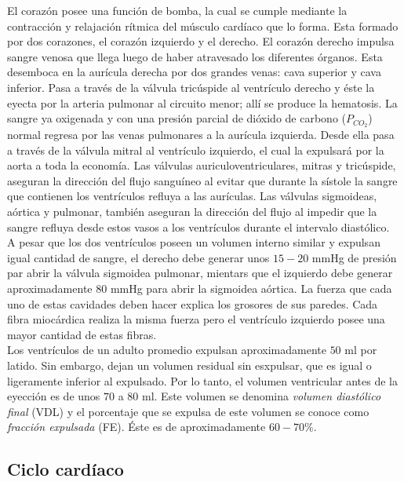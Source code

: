 El corazón posee una función de bomba, la cual se cumple mediante la contracción y relajación rítmica del músculo
cardíaco que lo forma. Esta formado por dos corazones, el corazón izquierdo y el derecho. El corazón derecho impulsa
sangre venosa que llega luego de haber atravesado los diferentes órganos. Esta desemboca en la aurícula derecha por
dos grandes venas: cava superior y cava inferior. Pasa a través de la válvula tricúspide al ventrículo derecho y
éste la eyecta por la arteria pulmonar al circuito menor; allí se produce la hematosis. La sangre ya oxigenada y con
una presión parcial de dióxido de carbono ($P_{CO_2}$) normal regresa por las venas pulmonares a la aurícula
izquierda. Desde ella pasa a través de la válvula mitral al ventrículo izquierdo, el cual la expulsará por la aorta
a toda la economía. Las válvulas auriculoventriculares, mitras y tricúspide, aseguran la dirección del flujo
sanguíneo al evitar que durante la sístole la sangre que contienen los ventrículos refluya a las aurículas. Las
válvulas sigmoideas, aórtica y pulmonar, también aseguran la dirección del flujo al impedir que la sangre refluya
desde estos vasos a los ventrículos durante el intervalo diastólico. \\
\indent A pesar que los dos ventrículos poseen un volumen interno similar y expulsan igual cantidad de sangre, el
derecho debe generar unos $15-20$ mmHg de presión par abrir la válvula sigmoidea pulmonar, mientars que el izquierdo
debe generar aproximadamente $80$ mmHg para abrir la sigmoidea aórtica. La fuerza que cada uno de estas cavidades
deben hacer explica los grosores de sus paredes. Cada fibra miocárdica realiza la misma fuerza pero el ventrículo
izquierdo posee una mayor cantidad de estas fibras. \\
\indent Los ventrículos de un adulto promedio expulsan aproximadamente $50$ ml por latido. Sin embargo, dejan un
volumen residual sin esxpulsar, que es igual o ligeramente inferior al expulsado. Por lo tanto, el volumen
ventricular antes de la eyección es de unos $70$ a $80$ ml. Este volumen se denomina \textit{volumen diastólico
final} (VDL) y el porcentaje que se expulsa de este volumen se conoce como \textit{fracción expulsada} (FE). Éste es
de aproximadamente $60-70\%$.

\subsection*{Ciclo cardíaco}

